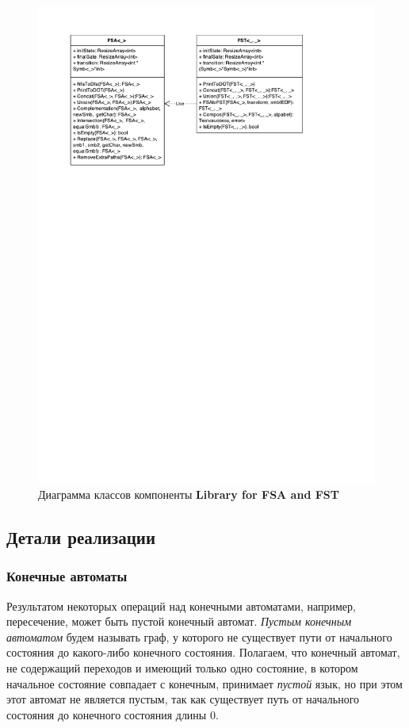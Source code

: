 \begin{figure}[h!]
\begin{center}
\includegraphics[width=1.0\textwidth]{Polubelova/ClassDiagramLib}
\caption{Диаграмма классов компоненты \textbf{Library for FSA and FST} }
\label{fig:ClassLib} 
\end{center}
\end{figure}


\subsection{Детали реализации}

\subsubsection{Конечные автоматы}

Результатом некоторых операций над конечными автоматами, например, пересечение, может быть пустой конечный автомат. \textit{Пустым конечным автоматом} будем называть граф, у которого не существует пути от начального состояния до какого-либо конечного состояния. Полагаем, что конечный автомат, не содержащий переходов и имеющий только одно состояние, в котором начальное состояние совпадает с конечным, принимает \textit{пустой} язык, но при этом этот автомат не является пустым, так как существует путь от начального состояния до конечного состояния длины 0. 

